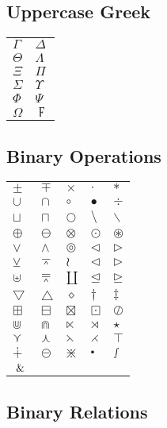 \documentclass{article}
\begin{document}
\subsection{Uppercase Greek}

\begin{tabular}{ll}
$\Gamma $ & $\Delta $ \\ 
$\Theta $ & $\Lambda $ \\ 
$\Xi $ & $\Pi $ \\ 
$\Sigma $ & $\Upsilon $ \\ 
$\Phi $ & $\Psi $ \\ 
$\Omega $ & $\digamma $%
\end{tabular}

\subsection{Binary Operations}

\begin{tabular}{lllll}
$\pm $ & $\mp $ & $\times $ & $\cdot $ & $\ast $ \\ 
$\cup $ & $\cap $ & $\circ $ & $\bullet $ & $\div $ \\ 
$\sqcup $ & $\sqcap $ & $\bigcirc $ & $\setminus $ & $\smallsetminus $ \\ 
$\oplus $ & $\ominus $ & $\otimes $ & $\odot $ & $\circledast $ \\ 
$\vee $ & $\wedge $ & $\circledcirc $ & $\lhd $ & $\rhd $ \\ 
$\veebar $ & $\barwedge $ & $\wr $ & $\triangleleft $ & $\triangleright $ \\ 
$\uplus $ & $\doublebarwedge $ & $\amalg $ & $\unlhd $ & $\unrhd $ \\ 
$\bigtriangledown $ & $\bigtriangleup $ & $\diamond $ & $\dagger $ & $%
\ddagger $ \\ 
$\boxplus $ & $\boxminus $ & $\boxtimes $ & $\boxdot $ & $\oslash $ \\ 
$\Cup $ & $\Cap $ & $\ltimes $ & $\rtimes $ & $\star $ \\ 
$\curlyvee $ & $\curlywedge $ & $\leftthreetimes $ & $\rightthreetimes $ & $%
\intercal $ \\ 
$\dotplus $ & $\circleddash $ & $\divideontimes $ & $\centerdot $ & $%
\smallint $ \\ 
$\And $ &  &  &  & 
\end{tabular}

\subsection{Binary Relations}
\end{document}
